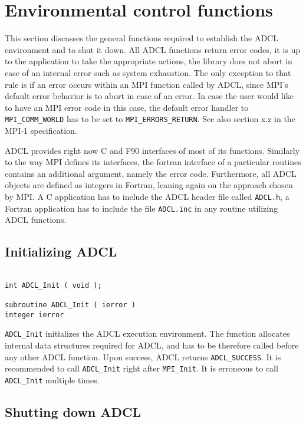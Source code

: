 \section{Environmental control functions}

This section discusses the general functions required to establish the ADCL environment and to shut it down.
All ADCL functions return error codes, it is up to the application to take the appropriate actions, the library does not abort in case of an internal error such as system exhaustion. The only exception to that rule is if an error occurs within an MPI function called by ADCL, since MPI's default error behavior is to abort in case of an error. In case the user would like to have an MPI error code in this case, the default error handler to {\tt MPI\_COMM\_WORLD} has to be set to {\tt MPI\_ERRORS\_RETURN}. See also section x.z in the MPI-1 specification.

ADCL provides right now C and F90 interfaces of most of its functions. Similarly to the way MPI defines its interfaces, the fortran interface of a particular routines contains an additional argument, namely the error code. Furthermore, all ADCL objects are defined as integers in Fortran, leaning again on the approach chosen by MPI. A C application has to include the ADCL header file called {\tt ADCL.h}, a Fortran application has to include the file {\tt ADCL.inc} in any routine utilizing ADCL functions.

\subsection{Initializing ADCL}
\begin{verbatim}

int ADCL_Init ( void );

subroutine ADCL_Init ( ierror )
integer ierror

\end{verbatim}

{\tt ADCL\_Init} initializes the ADCL execution environment. The function allocates internal data structures required for ADCL, and has to be therefore called before any other ADCL function. Upon success, ADCL returns {\tt ADCL\_SUCCESS}. It is recommended to call {\tt ADCL\_Init} right after {\tt MPI\_Init}. It is erroneous to call {\tt ADCL\_Init} multiple times.

\subsection{Shutting down ADCL}

